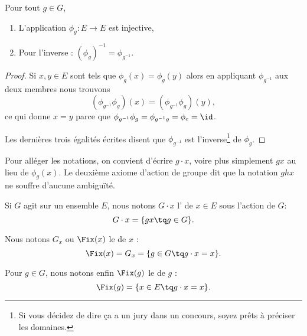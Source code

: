 \begin{lemma}
    Pour tout \( g\in G\),
    \begin{enumerate}
        \item
            L'application \( \phi_g\colon E\to E\) est injective,
        \item
            Pour l'inverse : \( (\phi_g)^{-1}=\phi_{g^{-1}}\).
    \end{enumerate}
\end{lemma}

\begin{proof}
    Si \( x,y\in E\) sont tels que \( \phi_g(x)=\phi_g(y)\) alors en appliquant \( \phi_{g^{-1}}\) aux deux membres nous trouvons
    \begin{equation}
        (\phi_{g^{-1}}\phi_g)(x)=(\phi_{g^{-1}}\phi_g)(y),
    \end{equation}
    ce qui donne \( x=y\) parce que \( \phi_{g^{-1}}\phi_g=\phi_{g^{-1}g}=\phi_e=\id\).

    Les dernières trois égalités écrites disent que \( \phi_{g^{-1}}\) est l'inverse\footnote{Si vous décidez de dire ça a un jury dans un concours, soyez prêts à préciser les domaines.} de \( \phi_g\).
\end{proof}

Pour alléger les notations, on convient d'écrire $g \cdot x$, voire plus simplement $gx$ au lieu de \( \phi_g(x) \). Le deuxième axiome d'action de groupe dit que la notation $ghx$ ne souffre d'aucune ambiguïté.

\begin{definition}

    Si \( G\) agit sur un ensemble \( E\), nous notons \( G\cdot x\) l' de \( x\in E\) sous l'action de $G$:
\begin{equation*}
    G\cdot x = \{ gx \tq g \in G\}.
\end{equation*}

Nous notons \( G_x\) ou \( \Fix(x)\) le  de \( x\) :
\begin{equation}
    \Fix(x)=G_x=\{ g\in G\tq g\cdot x=x \}.
\end{equation}

    Pour \( g\in G\), nous notons enfin \( \Fix(g)\) le  de \( g\) :
\begin{equation}
    \Fix(g)=\{ x\in E\tq g\cdot x=x \}.
\end{equation}

\end{definition}

